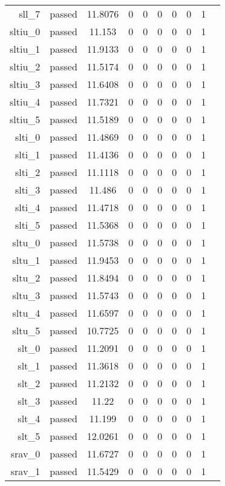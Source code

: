 \begin{longtable}{r|ccccccccc}
    sll\_7 & passed & 11.8076 & 0 & 0 & 0 & 0 & 0 & 1 \\
    sltiu\_0 & passed & 11.153 & 0 & 0 & 0 & 0 & 0 & 1 \\
    sltiu\_1 & passed & 11.9133 & 0 & 0 & 0 & 0 & 0 & 1 \\
    sltiu\_2 & passed & 11.5174 & 0 & 0 & 0 & 0 & 0 & 1 \\
    sltiu\_3 & passed & 11.6408 & 0 & 0 & 0 & 0 & 0 & 1 \\
    sltiu\_4 & passed & 11.7321 & 0 & 0 & 0 & 0 & 0 & 1 \\
    sltiu\_5 & passed & 11.5189 & 0 & 0 & 0 & 0 & 0 & 1 \\
    slti\_0 & passed & 11.4869 & 0 & 0 & 0 & 0 & 0 & 1 \\
    slti\_1 & passed & 11.4136 & 0 & 0 & 0 & 0 & 0 & 1 \\
    slti\_2 & passed & 11.1118 & 0 & 0 & 0 & 0 & 0 & 1 \\
    slti\_3 & passed & 11.486 & 0 & 0 & 0 & 0 & 0 & 1 \\
    slti\_4 & passed & 11.4718 & 0 & 0 & 0 & 0 & 0 & 1 \\
    slti\_5 & passed & 11.5368 & 0 & 0 & 0 & 0 & 0 & 1 \\
    sltu\_0 & passed & 11.5738 & 0 & 0 & 0 & 0 & 0 & 1 \\
    sltu\_1 & passed & 11.9453 & 0 & 0 & 0 & 0 & 0 & 1 \\
    sltu\_2 & passed & 11.8494 & 0 & 0 & 0 & 0 & 0 & 1 \\
    sltu\_3 & passed & 11.5743 & 0 & 0 & 0 & 0 & 0 & 1 \\
    sltu\_4 & passed & 11.6597 & 0 & 0 & 0 & 0 & 0 & 1 \\
    sltu\_5 & passed & 10.7725 & 0 & 0 & 0 & 0 & 0 & 1 \\
    slt\_0 & passed & 11.2091 & 0 & 0 & 0 & 0 & 0 & 1 \\
    slt\_1 & passed & 11.3618 & 0 & 0 & 0 & 0 & 0 & 1 \\
    slt\_2 & passed & 11.2132 & 0 & 0 & 0 & 0 & 0 & 1 \\
    slt\_3 & passed & 11.22 & 0 & 0 & 0 & 0 & 0 & 1 \\
    slt\_4 & passed & 11.199 & 0 & 0 & 0 & 0 & 0 & 1 \\
    slt\_5 & passed & 12.0261 & 0 & 0 & 0 & 0 & 0 & 1 \\
    srav\_0 & passed & 11.6727 & 0 & 0 & 0 & 0 & 0 & 1 \\
    srav\_1 & passed & 11.5429 & 0 & 0 & 0 & 0 & 0 & 1 \\

\end{longtable}
